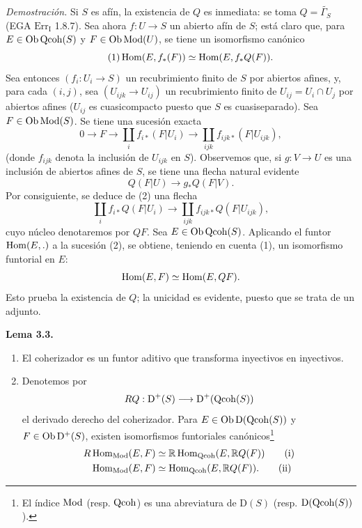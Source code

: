\emph{Demostración.} Si $S$ es afín, la existencia de $Q$ es inmediata: se toma $Q=\widetilde{\Gamma_S}$ (EGA $\mathrm{Err}_{\mathrm I}$ 1.8.7). Sea ahora $f:U\longrightarrow S$ un abierto afín de $S$; está claro que, para $E\in\operatorname{Ob}\operatorname{Qcoh}(S)$ y $F\in\operatorname{Ob}\operatorname{Mod}(U)$, se tiene un isomorfismo canónico
\begin{equation}\tag{1}
 \operatorname{Hom}(E,f_*(F))\simeq \operatorname{Hom}(E,f_*Q(F)).
\end{equation}
Sea entonces $(f_i:U_i\longrightarrow S)$ un recubrimiento finito de $S$ por abiertos afines, y, para cada $(i,j)$, sea $(U_{ijk}\longrightarrow U_{ij})$ un recubrimiento finito de $U_{ij}=U_i\cap U_j$ por abiertos afines ($U_{ij}$ es cuasicompacto puesto que $S$ es cuasiseparado). Sea $F\in\operatorname{Ob}\operatorname{Mod}(S)$. Se tiene una sucesión exacta
\begin{equation}\tag{2}
 0\longrightarrow F\longrightarrow \coprod_i f_{i*}(F|U_i)
 \longrightarrow \coprod_{ijk}f_{ijk*}(F|U_{ijk}),
\end{equation}
(donde $f_{ijk}$ denota la inclusión de $U_{ijk}$ en $S$). Observemos que, si $g:V\longrightarrow U$ es una inclusión de abiertos afines de $S$, se tiene una flecha natural evidente
\[
 Q(F|U)\longrightarrow g_*Q(F|V).
\]
Por consiguiente, se deduce de (2) una flecha
\begin{equation}\tag{3}
 \coprod_i f_{i*}Q(F|U_i)\longrightarrow
 \coprod_{ijk}f_{ijk*}Q(F|U_{ijk}),
\end{equation}
cuyo núcleo denotaremos por $QF$. Sea $E\in\operatorname{Ob}\operatorname{Qcoh}(S)$. Aplicando el funtor $\operatorname{Hom}(E,.)$ a la sucesión (2), se obtiene, teniendo en cuenta (1), un isomorfismo funtorial en $E$:
\[
 \operatorname{Hom}(E,F)\simeq\operatorname{Hom}(E,QF).
\]
Esto prueba la existencia de $Q$; la unicidad es evidente, puesto que se trata de un adjunto.

\textbf{Lema 3.3.} \begin{enumerate}[label=\alph*)]
\item El coherizador es un funtor aditivo que transforma inyectivos en inyectivos.
\item Denotemos por
\[
 RQ:\mathrm D^+(S)\longrightarrow \mathrm D^+(\operatorname{Qcoh}(S))
\]
el derivado derecho del coherizador. Para $E\in\operatorname{Ob}\mathrm D(\operatorname{Qcoh}(S))$ y $F\in\operatorname{Ob}\mathrm D^+(S)$, existen isomorfismos funtoriales canónicos\footnote{El índice $\operatorname{Mod}$ (resp. $\operatorname{Qcoh}$) es una abreviatura de $\mathrm D(S)$ (resp. $\mathrm D(\operatorname{Qcoh}(S))$).}
\begin{align}
 R\operatorname{Hom}_{\operatorname{Mod}}(E,F)&\simeq \mathbb R\operatorname{Hom}_{\operatorname{Qcoh}}(E,\mathbb RQ(F)) \tag{i}\\
 \operatorname{Hom}_{\operatorname{Mod}}(E,F)&\simeq \operatorname{Hom}_{\operatorname{Qcoh}}(E,\mathbb RQ(F)). \tag{ii}
\end{align}
\end{enumerate}

